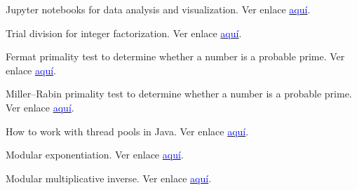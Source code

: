 \begin{thebibliography}{1}
Jupyter notebooks for data analysis and visualization. Ver enlace \href{https://jupyter.org/}{\textcolor{blue}{aquí}}.

Trial division for integer factorization. Ver enlace \href{https://en.wikipedia.org/wiki/Trial_division}{\textcolor{blue}{aquí}}.

Fermat primality test to determine whether a number is a probable prime. Ver enlace \href{https://en.wikipedia.org/wiki/Fermat_primality_test}{\textcolor{blue}{aquí}}.

Miller–Rabin primality test to determine whether a number is a probable prime. Ver enlace \href{https://en.wikipedia.org/wiki/Miller%E2%80%93Rabin_primality_test}{\textcolor{blue}{aquí}}.

How to work with thread pools in Java. Ver enlace \href{https://www.baeldung.com/thread-pool-java-and-guava}{\textcolor{blue}{aquí}}.

Modular exponentiation. Ver enlace \href{https://en.wikipedia.org/wiki/Modular_exponentiation}{\textcolor{blue}{aquí}}.

Modular multiplicative inverse. Ver enlace \href{https://en.wikipedia.org/wiki/Modular_multiplicative_inverse}{\textcolor{blue}{aquí}}.

\end{thebibliography}